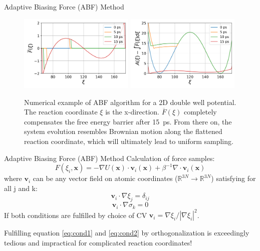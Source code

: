\documentclass[10pt]{beamer}
\begin{document}
\begin{frame}{Adaptive Biasing Force (ABF) Method}
\begin{figure}[H]
    \centering
    \includegraphics[width=0.49\textwidth]{bilder/talk/ABF_force}
    \includegraphics[width=0.49\textwidth]{bilder/talk/ABF_freeE}
      \caption{Numerical example of ABF algorithm for a 2D double well potential. The reaction coordinate $\xi$ is the x-direction. $\overline{F}(\xi)$ completely compensates the free energy barrier after 15~ps. From there on, the system evolution resembles Brownian motion along the flattened reaction coordinate, which will ultimately lead to uniform sampling.}
\end{figure}
\end{frame}

\begin{frame}{Adaptive Biasing Force (ABF) Method}
Calculation of force samples:
\begin{equation}
  F(\xi_i,\textbf{x}) = -\nabla U(\textbf{x}) \cdot \textbf{v}_i(\textbf{x}) + \beta^{-1} \nabla \cdot \textbf{v}_i(\textbf{x})
\end{equation}
where $\textbf{v}_i$ can be any vector field on atomic coordinates ($\mathbb{R}^{3N} \to \mathbb{R}^{3N}$) satisfying for all j and k:
\begin{equation}
  \textbf{v}_i \cdot \nabla \xi_j = \delta_{ij} \label{eq:cond1}
\end{equation}
\begin{equation}
  \textbf{v}_i \cdot \nabla \sigma_k = 0 \label{eq:cond2}
\end{equation}
If both conditions are fulfilled by choice of CV $\textbf{v}_i = \nabla \xi_i/|\nabla \xi_i|^2$.
\begin{tcolorbox}[colback=green!5,colframe=green!40!black]
Fulfilling equation \ref{eq:cond1} and \ref{eq:cond2} by orthogonalization is exceedingly tedious and impractical for complicated reaction coordinates!
\end{tcolorbox}
\end{frame}
\end{document}
